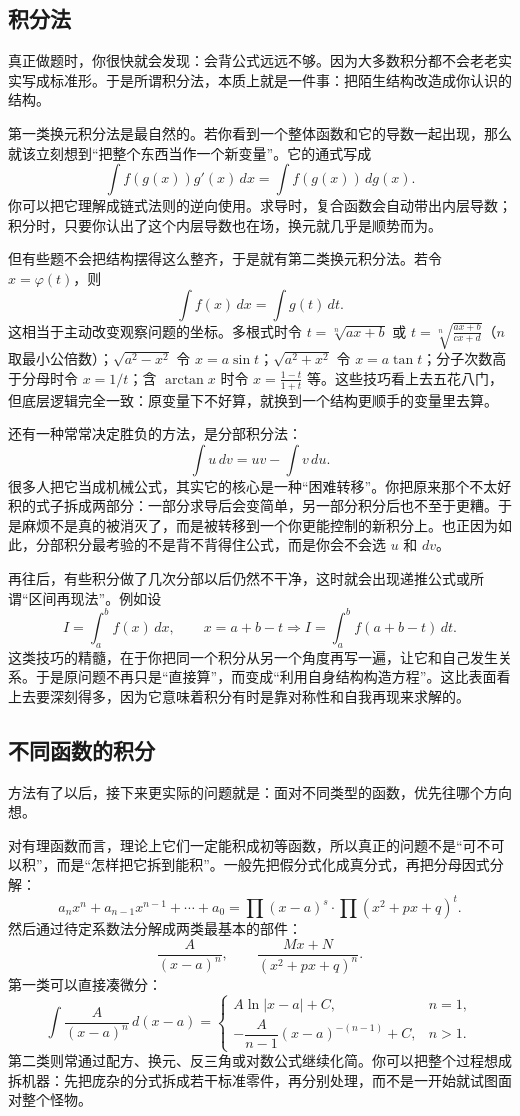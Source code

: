 \documentclass[UTF8]{ctexbook}
\begin{document}
\subsection{积分法}
真正做题时，你很快就会发现：会背公式远远不够。因为大多数积分都不会老老实实写成标准形。于是所谓积分法，本质上就是一件事：把陌生结构改造成你认识的结构。

第一类换元积分法是最自然的。若你看到一个整体函数和它的导数一起出现，那么就该立刻想到“把整个东西当作一个新变量”。它的通式写成
\[
\int f(g(x))g'(x)\,dx=\int f(g(x))\,dg(x).
\]
你可以把它理解成链式法则的逆向使用。求导时，复合函数会自动带出内层导数；积分时，只要你认出了这个内层导数也在场，换元就几乎是顺势而为。

但有些题不会把结构摆得这么整齐，于是就有第二类换元积分法。若令 $x=\varphi(t)$，则
\[
\int f(x)\,dx=\int g(t)\,dt.
\]
这相当于主动改变观察问题的坐标。多根式时令 $t=\sqrt[n]{ax+b}$ 或 $t=\sqrt[n]{\frac{ax+b}{cx+d}}$（$n$ 取最小公倍数）；$\sqrt{a^2-x^2}$ 令 $x=a\sin t$；$\sqrt{a^2+x^2}$ 令 $x=a\tan t$；分子次数高于分母时令 $x=1/t$；含 $\arctan x$ 时令 $x=\frac{1-t}{1+t}$ 等。这些技巧看上去五花八门，但底层逻辑完全一致：原变量下不好算，就换到一个结构更顺手的变量里去算。

还有一种常常决定胜负的方法，是分部积分法：
\[
\int u\,dv=uv-\int v\,du.
\]
很多人把它当成机械公式，其实它的核心是一种“困难转移”。你把原来那个不太好积的式子拆成两部分：一部分求导后会变简单，另一部分积分后也不至于更糟。于是麻烦不是真的被消灭了，而是被转移到一个你更能控制的新积分上。也正因为如此，分部积分最考验的不是背不背得住公式，而是你会不会选 $u$ 和 $dv$。

再往后，有些积分做了几次分部以后仍然不干净，这时就会出现递推公式或所谓“区间再现法”。例如设
\[
I=\int_a^b f(x)\,dx,\qquad x=a+b-t\Rightarrow I=\int_a^b f(a+b-t)\,dt.
\]
这类技巧的精髓，在于你把同一个积分从另一个角度再写一遍，让它和自己发生关系。于是原问题不再只是“直接算”，而变成“利用自身结构构造方程”。这比表面看上去要深刻得多，因为它意味着积分有时是靠对称性和自我再现来求解的。

\subsection{不同函数的积分}
方法有了以后，接下来更实际的问题就是：面对不同类型的函数，优先往哪个方向想。

对有理函数而言，理论上它们一定能积成初等函数，所以真正的问题不是“可不可以积”，而是“怎样把它拆到能积”。一般先把假分式化成真分式，再把分母因式分解：
\[
a_nx^n+a_{n-1}x^{n-1}+\cdots+a_0=\prod (x-a)^s\cdot \prod (x^2+px+q)^t.
\]
然后通过待定系数法分解成两类最基本的部件：
\[
\frac{A}{(x-a)^n},\qquad \frac{Mx+N}{(x^2+px+q)^n}.
\]
第一类可以直接凑微分：
\[
\int \frac{A}{(x-a)^n}\,d(x-a)=
\begin{cases}
A\ln|x-a|+C,& n=1,\\
-\dfrac{A}{n-1}(x-a)^{-(n-1)}+C,& n>1.
\end{cases}
\]
第二类则常通过配方、换元、反三角或对数公式继续化简。你可以把整个过程想成拆机器：先把庞杂的分式拆成若干标准零件，再分别处理，而不是一开始就试图面对整个怪物。
\end{document}
